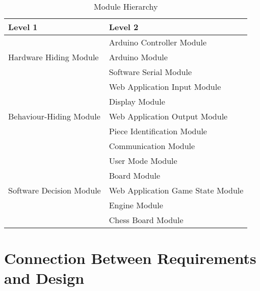\documentclass[12pt, titlepage]{article}
\begin{document}
\begin{table}[h!]
\centering
\begin{tabular}{p{} p{}}
\toprule
\textbf{Level 1} & \textbf{Level 2}\\
\midrule

\multirow{3}{0.3\textwidth}{Hardware Hiding Module}
& Arduino Controller Module \\ 
& Arduino Module \\
& Software Serial Module \\
\midrule

\multirow{5}{0.3\textwidth}{Behaviour-Hiding Module} 
& Web Application Input Module\\
& Display Module\\
& Web Application Output Module\\
& Piece Identification Module \\
& Communication Module\\
\midrule

\multirow{5}{0.3\textwidth}{Software Decision Module} 
& User Mode Module\\
& Board Module\\
& Web Application Game State Module\\
& Engine Module\\
& Chess Board Module\\
\bottomrule

\end{tabular}
\caption{Module Hierarchy}
\label{TblMH}
\end{table}

\section{Connection Between Requirements and Design} \label{SecConnection}
\end{document}
